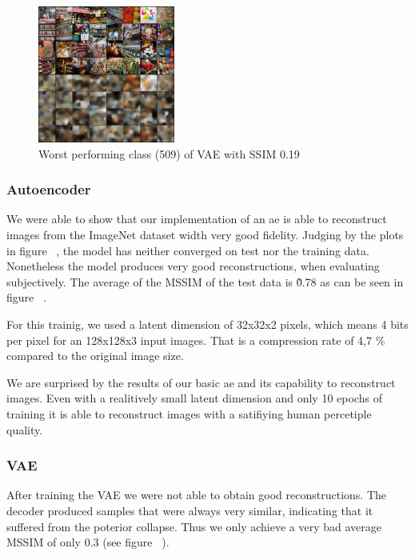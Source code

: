     \begin{figure}
        \centering
        \includegraphics[width=0.4\textwidth]{../../sample_images/evaluation/MIN_VAE_IDX_509.png}
        \caption{Worst performing class (509) of VAE with SSIM 0.19}
        \label{fig:imnet_worst_perf2_vae}
    \end{figure}
    
    \subsubsection{Autoencoder}\label{subsubsec:autoencoder}
        We were able to show that our implementation of an \ac{ae} is able to reconstruct images from the ImageNet dataset width very good fidelity.
        Judging by the plots in figure ~\cite{citationNeeded}, the model has neither converged on test nor the training data.
        Nonetheless the model produces very good reconstructions, when evaluating subjectively.
        The average of the MSSIM of the test data is \~0.78 as can be seen in figure ~\cite{citationNeeded}.

        For this trainig, we used a latent dimension of 32x32x2 pixels, which means 4 bits per pixel for an 128x128x3 input images. That is a compression rate of 4,7 \% compared to the original image size.

        We are surprised by the results of our basic \ac{ae} and its capability to reconstruct images. Even with a realitively small latent dimension and only 10 epochs of training it is able to reconstruct images with a satifiying human percetiple quality.
    
    \subsubsection{VAE}\label{subsubsec:vae_training}
        After training the VAE we were not able to obtain good reconstructions.
        The decoder produced samples that were always very similar, indicating that it suffered from the poterior collapse.
        Thus we only achieve a very bad average MSSIM of only 0.3 (see figure ~\cite{citationNeeded}).


